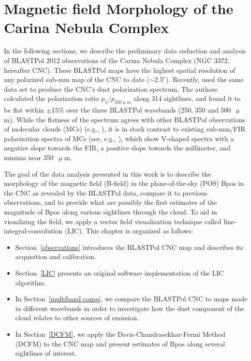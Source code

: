 \chapter{Magnetic field Morphology of the Carina Nebula Complex}\label{carina}

In the following sections, we describe the preliminary data reduction and analysis of BLASTPol 2012 \citep{galitzki2014balloon} observations of the Carina Nebula Complex (NGC 3372, hereafter CNC). These BLASTPol maps have the highest spatial resolution of any polarized sub-mm map of the CNC to date ($\sim$2.5$\operatorname{^{\prime}}$). Recently, \citet{shariff2015polarimetry} used the same data set to produce the CNC's dust polarization spectrum. The authors calculated the polarization ratio $p_\lambda/p_{350\upmu m}$ along 314 sightlines, and found it to be flat within $\pm 15\%$ over the three BLASTPol wavebands (250, 350 and 500~$\upmu$m). While the flatness of the spectrum agrees with other BLASTPol observations of molecular clouds (MCs) (e.g., \citet{ashton2018first,gandilo2016submillimeter}), it is in stark contrast to existing sub-mm/FIR polarization spectra of MCs (see, e.g., \citet{vaillancourt2012submillimeter}), which show V-shaped spectra with a negative slope towards the FIR, a positive slope towards the millimeter, and minima near 350~$\upmu$m.

The goal of the data analysis presented in this work is to describe the morphology of the magnetic field (B-field) in the plane-of-the-sky (POS) \gls{Bpos} in the CNC as revealed by the BLASTPol data, compare it to previous observations, and to provide what are possibly the first estimates of the magnitude of \gls{Bpos} along various sightlines through the cloud. To aid in visualizing the field, we apply a vector field visualization technique called line-integral-convolution (LIC). This chapter is organized as follows:

\begin{itemize}[nosep]
  \item Section~\ref{observations} introduces the BLASTPol CNC map and describes its acquisition and calibration.
  \item Section~\ref{LIC} presents an original software implementation of the LIC algorithm.
  \item In Section~\ref{multiband comp}, we compare the BLASTPol CNC to maps made in different wavebands in order to investigate how the dust component of the cloud relates to other sources of emission.
  \item In Section~\ref{DCFM}, we apply the Davis-Chandrasekhar-Fermi Method (DCFM) to the CNC map and present estimates of \gls{Bpos} along several sightlines of interest.
\end{itemize}

